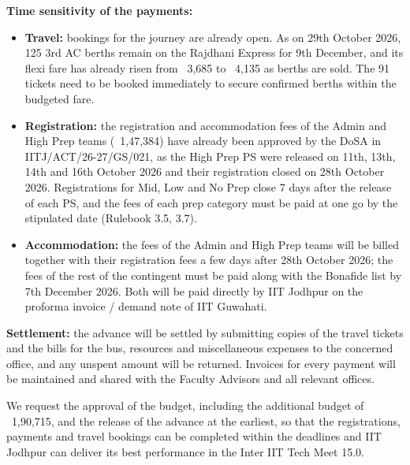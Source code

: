 \documentclass[11pt,letterpaper]{article}
\newcommand{\rs}{{\rupee}}
\begin{document}
\textbf{Time sensitivity of the payments:}
\begin{itemize}
  \item \textbf{Travel:} bookings for the journey are already open. As on 29th October 2026, 125 3rd AC berths remain on the Rajdhani Express for 9th December, and its flexi fare has already risen from \rs~3,685 to \rs~4,135 as berths are sold. The 91 tickets need to be booked immediately to secure confirmed berths within the budgeted fare.
  \item \textbf{Registration:} the registration and accommodation fees of the Admin and High Prep teams (\rs~1,47,384) have already been approved by the DoSA in IITJ/ACT/26-27/GS/021, as the High Prep PS were released on 11th, 13th, 14th and 16th October 2026 and their registration closed on 28th October 2026. Registrations for Mid, Low and No Prep close 7 days after the release of each PS, and the fees of each prep category must be paid at one go by the stipulated date (Rulebook 3.5, 3.7).
  \item \textbf{Accommodation:} the fees of the Admin and High Prep teams will be billed together with their registration fees a few days after 28th October 2026; the fees of the rest of the contingent must be paid along with the Bonafide list by 7th December 2026. Both will be paid directly by IIT Jodhpur on the proforma invoice / demand note of IIT Guwahati.
\end{itemize}

\textbf{Settlement:} the advance will be settled by submitting copies of the travel tickets and the bills for the bus, resources and miscellaneous expenses to the concerned office, and any unspent amount will be returned. Invoices for every payment will be maintained and shared with the Faculty Advisors and all relevant offices.

We request the approval of the budget, including the additional budget of \rs~1,90,715, and the release of the advance at the earliest, so that the registrations, payments and travel bookings can be completed within the deadlines and IIT Jodhpur can deliver its best performance in the Inter IIT Tech Meet 15.0.
\end{document}
